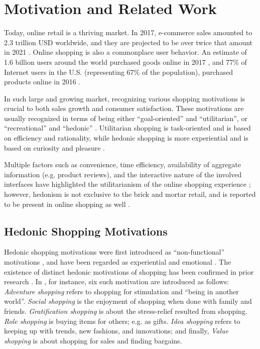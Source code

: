\section{Motivation and Related Work}
\label{intro}
Today, online retail is a thriving market. In 2017, e-commerce sales amounted to 2.3 trillion USD worldwide, and they are projected to be over twice that amount in 2021 \cite{big-dollars}. Online shopping is also a commonplace user behavior. An estimate of 1.6 billion users around the world purchased goods online in 2017 \cite{many-people}, and 77\% of Internet users in the U.S. (representing 67\% of the population), purchased products online in 2016 \cite{online-shopping-US}. 

In such large and growing market, recognizing various shopping motivations is crucial to both sales growth and consumer satisfaction. These motivations are usually recognized in terms of being either ``goal-oriented'' and ``utilitarian'', or ``recreational'' and ``hedonic'' \cite{motivations1,motivations2}. Utilitarian shopping is task-oriented and is based on efficiency and rationality, while hedonic shopping is more experiential and is based on curiosity and pleasure \cite{scarpi2012work}. 

Multiple factors such as convenience, time efficiency, availability of aggregate information (e.g. product reviews), and the interactive nature of the involved interfaces have highlighted the utilitarianism of the online shopping experience \cite{hedonicandutil1}; however, hedonism is not exclusive to the brick and mortar retail, and is reported to be present in online shopping as well \cite{parsons,funorshopping,hedonicandutil1,hedonicandutil2}. 

\subsection{Hedonic Shopping Motivations}

Hedonic shopping motivations were first introduced as ``non-functional'' motivations \cite{tauber1972people}, and have been regarded as experiential and emotional \cite{hedonicandutil1,funorshopping}. The existence of distinct hedonic motivations of shopping has been confirmed in prior research \cite{hedonictabagh1,hedonicandutil2,flowguy}. In \cite{hedonictabagh2}, for instance, six such motivation are introduced as follows: \textit{Adventure shopping} refers to shopping for stimulation and ``being in another world''. \textit{Social shopping} is the enjoyment of shopping when done with family and friends. \textit{Gratification shopping} is about the stress-relief resulted from shopping. \textit{Role shopping} is buying items for others; e.g. as gifts. \textit{Idea shopping} refers to keeping up with trends, new fashions, and innovations; and finally, \textit{Value shopping} is about shopping for sales and finding bargains.

